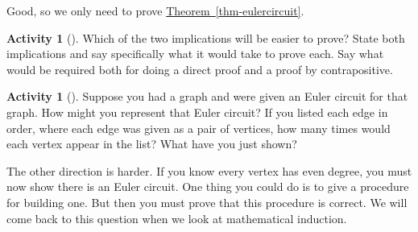 \documentclass[10pt,]{book}
\theoremstyle{plain}
\theoremstyle{definition}
\theoremstyle{definition}
\theoremstyle{definition}
\newtheorem{activity}[project]{Activity}
\numberwithin{equation}{chapter}
\begin{document}
\hypertarget{p-186}{}%
Good, so we only need to prove \hyperref[thm-eulercircuit]{Theorem~\ref{thm-eulercircuit}}.%
\begin{activity}[]\label{activity-11}
\hypertarget{p-187}{}%
Which of the two implications will be easier to prove?  State both implications and say specifically what it would take to prove each.  Say what would be required both for doing a direct proof and a proof by contrapositive.%
\end{activity}
\begin{activity}[]\label{activity-12}
\hypertarget{p-188}{}%
Suppose you had a graph and were given an Euler circuit for that graph.  How might you represent that Euler circuit?  If you listed each edge in order, where each edge was given as a pair of vertices, how many times would each vertex appear in the list?  What have you just shown?%
\end{activity}
\hypertarget{p-189}{}%
The other direction is harder.  If you know every vertex has even degree, you must now show there is an Euler circuit.  One thing you could do is to give a procedure for building one.  But then you must prove that this procedure is correct.  We will come back to this question when we look at mathematical induction.%
\typeout{************************************************}
\typeout{************************************************}
\end{document}
